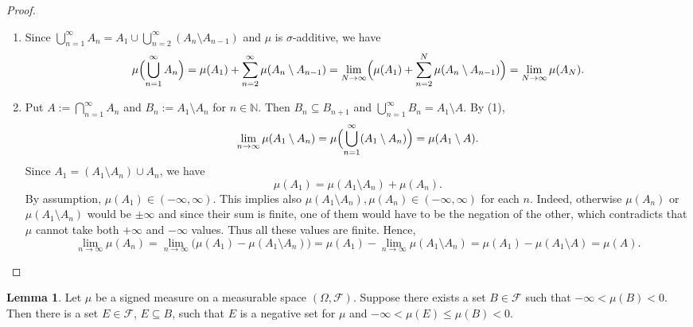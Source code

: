 \documentclass[11pt,a4paper]{article}
\theoremstyle{definition}
\newtheorem{lemma}{Lemma}[section]
\begin{document}
\begin{proof} $ $
    \begin{enumerate}
        \item  Since $\bigcup_{n=1}^\infty A_n = A_1 \cup \bigcup_{n=2}^\infty (A_n\setminus A_{n-1})$ and $\mu$ is $\sigma$-additive, we have
\[
\mu\Bigl(\bigcup_{n=1}^\infty A_n\Bigr)
= \mu(A_1) + \sum_{n=2}^\infty \mu(A_n\setminus A_{n-1})
= \lim_{N\to\infty} \Bigl(\mu(A_1)+\sum_{n=2}^N\mu(A_n\setminus A_{n-1})\Bigr)
= \lim_{N\to\infty} \mu(A_N).
\]
\item Put $A:=\bigcap_{n=1}^\infty A_n$ and $B_n := A_1\setminus A_n$ for $n\in\mathbb{N}$.  Then $B_n\subseteq B_{n+1}$ and $\bigcup_{n=1}^\infty B_n = A_1\setminus A$.  By (1),
\[
\lim_{n\to\infty} \mu(A_1\setminus A_n)
= \mu\Bigl(\bigcup_{n=1}^\infty (A_1\setminus A_n)\Bigr)
= \mu(A_1\setminus A).
\]
Since $A_1 = (A_1\setminus A_n) \cup A_n$, we have 
\[
\mu(A_1) = \mu(A_1\setminus A_n) + \mu(A_n).
\]
By assumption, $\mu(A_1)\in(-\infty,\infty)$.  This implies also $\mu(A_1\setminus A_n),\mu(A_n)\in(-\infty,\infty)$ for each $n$. Indeed, otherwise $\mu(A_n)$ or $\mu(A_1\setminus A_n)$ would be $\pm\infty$ and since their sum is finite, one of them would have to be the negation of the other, which contradicts that $\mu$ cannot take both $+\infty$ and $-\infty$ values.  Thus all these values are finite.  Hence,
\[
\lim_{n\to\infty} \mu(A_n)
= \lim_{n\to\infty} \bigl(\mu(A_1) - \mu(A_1\setminus A_n)\bigr)
= \mu(A_1) - \lim_{n\to\infty} \mu(A_1\setminus A_n)
= \mu(A_1) - \mu(A_1\setminus A)
= \mu(A).
\]
    \end{enumerate}
\end{proof}

\begin{lemma}
Let $\mu$ be a signed measure on a measurable space $(\Omega,\mathcal{F})$.  Suppose there exists a set $B\in \mathcal{F}$ such that $-\infty < \mu(B) < 0$.  Then there is a set $E\in \mathcal{F}$, $E\subseteq B$, such that $E$ is a negative set for $\mu$ and $-\infty < \mu(E) \le \mu(B)<0$.
\end{lemma}
\end{document}
